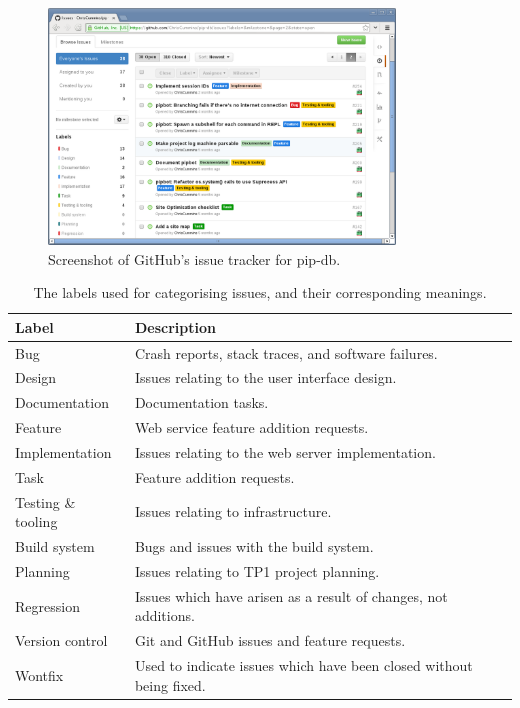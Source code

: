 \begin{figure}[H]
\centering
    \includegraphics[width=0.82\textwidth]{assets/github-issues}
\caption[Screenshot of GitHub's pip-db issue tracker]
        {Screenshot of GitHub's issue tracker for pip-db.}
\label{fig:github-issues}
\end{figure}


\begin{table}[H]
\centering
\begin{tabular}{l l}
\textbf{Label} & \textbf{Description}\\
\hline
Bug & Crash reports, stack traces, and software failures.\\
Design & Issues relating to the user interface design.\\
Documentation & Documentation tasks.\\
Feature & Web service feature addition requests.\\
Implementation & Issues relating to the web server implementation.\\
Task & Feature addition requests.\\
Testing \& tooling & Issues relating to infrastructure.\\
Build system & Bugs and issues with the build system.\\
Planning & Issues relating to TP1 project planning.\\
Regression & Issues which have arisen as a result of changes, not additions.\\
Version control & Git and GitHub issues and feature requests.\\
Wontfix & Used to indicate issues which have been closed without being fixed.\\
\end{tabular}
\caption[Issue tracker labels]
        {The labels used for categorising issues, and their corresponding meanings.}
\label{tab:issue-labels}
\end{table}


